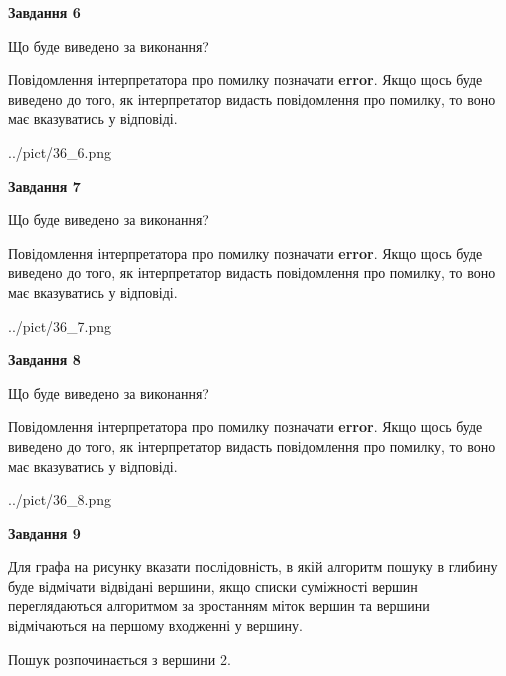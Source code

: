 \documentclass[12pt, ukrainian]{article}
\begin{document}
{\begin {large}
{\begin {center}\textbf{Завдання 6}\end {center}}\par
Що буде виведено за виконання?

Повідомлення інтерпретатора про помилку позначати \textbf{error}.
Якщо щось буде виведено до того, як інтерпретатор видасть повідомлення про помилку, 
то воно має вказуватись у відповіді. \par


\begin{center}
	{../pict/36_6.png}
\end{center}
\newpage

{\begin {center}\textbf{Завдання 7}\end {center}}\par
Що буде виведено за виконання?

Повідомлення інтерпретатора про помилку позначати \textbf{error}.
Якщо щось буде виведено до того, як інтерпретатор видасть повідомлення про помилку, 
то воно має вказуватись у відповіді. \par


\begin{center}
	{../pict/36_7.png}
\end{center}
\newpage

{\begin {center}\textbf{Завдання 8}\end {center}}\par
Що буде виведено за виконання?

Повідомлення інтерпретатора про помилку позначати \textbf{error}.
Якщо щось буде виведено до того, як інтерпретатор видасть повідомлення про помилку, 
то воно має вказуватись у відповіді. \par


\begin{center}
	{../pict/36_8.png}
\end{center}
\newpage

{\begin {center}\textbf{Завдання 9}\end {center}}\par
Для графа на рисунку вказати послідовність, в якій алгоритм пошуку в глибину буде відмічати відвідані вершини, якщо списки суміжності вершин переглядаються алгоритмом за зростанням міток вершин та вершини відмічаються на першому вход\-женні у вершину.\par
Пошук розпочинається з вершини 2.\par


\end{large}}
\end{document}
